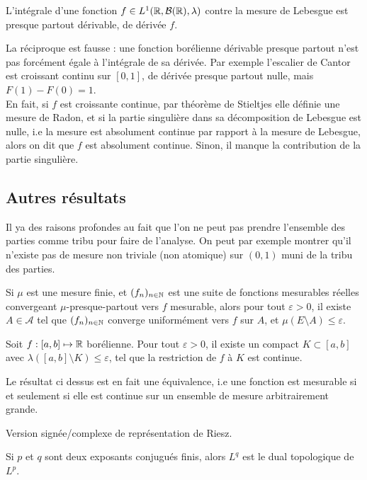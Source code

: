 \documentclass[11pt,a4paper]{article}
\begin{document}
\begin{corstar}
L'intégrale d'une fonction $f \in L^1(\mathbb R,\mathcal{B}(\mathbb R),\lambda)$ contre la mesure de Lebesgue est presque partout dérivable, de dérivée $f$.
\end{corstar}

\begin{rmq}
La réciproque est fausse : une fonction borélienne dérivable presque partout n'est pas forcément égale à l'intégrale de sa dérivée. Par exemple l'escalier de Cantor est croissant continu sur $[0,1]$, de dérivée presque partout nulle, mais $F(1)-F(0)=1$. \\
En fait, si $f$ est croissante continue, par théorème de Stieltjes elle définie une mesure de Radon, et si la partie singulière dans sa décomposition de Lebesgue est nulle, i.e la mesure est absolument continue par rapport à la mesure de Lebesgue, alors on dit que $f$ est absolument continue. Sinon, il manque la contribution de la partie singulière.
\end{rmq}


\subsection*{Autres résultats}

\begin{rmq}
Il ya des raisons profondes au fait que l'on ne peut pas prendre l'ensemble des parties comme tribu pour faire de l'analyse. On peut par exemple montrer qu'il n'existe pas de mesure non triviale (non atomique) sur $(0,1)$ muni de la tribu des parties.
\end{rmq}

\begin{thmstar}
[Egorov] Si $\mu$ est une mesure finie, et $(f_n)_{n\in \mathbb N}$ est une suite de fonctions mesurables réelles convergeant $\mu$-presque-partout vers $f$ mesurable, alors pour tout $\varepsilon > 0$, il existe $A\in \mathcal{A}$ tel que $(f_n)_{n\in \mathbb N}$ converge uniformément vers $f$ sur $A$, et $\mu(E\setminus A) \leq \varepsilon $. 
\end{thmstar}

\begin{thmstar}
[Lusin] Soit $f : [a,b] \mapsto \mathbb R$ borélienne. Pour tout $\varepsilon>0$, il existe un compact $K\subset [a,b]$ avec $\lambda([a,b]\setminus K) \leq \varepsilon$, tel que la restriction de $f$ à $K$ est continue.
\end{thmstar}

\begin{rmq}
Le résultat ci dessus est en fait une équivalence, i.e une fonction est mesurable si et seulement si elle est continue sur un ensemble de mesure arbitrairement grande.
\end{rmq}

\begin{thmstar}

\end{thmstar}

\begin{rmq}
Version signée/complexe de représentation de Riesz.
\end{rmq}

\begin{thmstar}[Dualité]
Si $p$ et $q$ sont deux exposants conjugués finis, alors $L^q$ est le dual topologique de $L^p$.
\end{thmstar}
\end{document}
